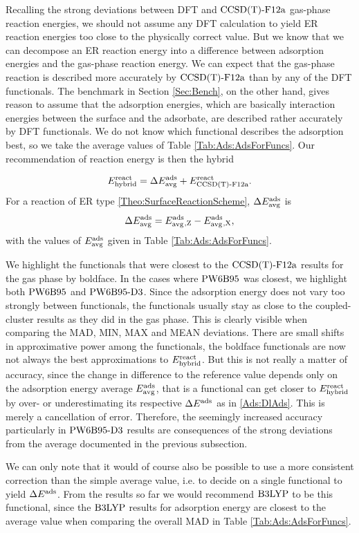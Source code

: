 Recalling the strong deviations between DFT and $\text{CCSD(T)-F12a}$ gas-phase
reaction energies, we should not assume any DFT calculation to yield
ER reaction energies too close to the physically correct value. But we know
that we can decompose an ER reaction energy into a difference between
adsorption energies and the gas-phase reaction energy. We can expect that
the gas-phase reaction is described more accurately by $\text{CCSD(T)-F12a}$ than by
any of the DFT functionals. The benchmark in Section \ref{Sec:Bench}, on
the other hand, gives reason to assume that the adsorption energies, which
are basically interaction energies between the surface and the adsorbate,
are described rather accurately by DFT functionals. We do not know which
functional describes the adsorption best, so we take the average values
of Table \ref{Tab:Ads:AdsForFuncs}. Our recommendation of reaction
energy is then the hybrid

\begin{equation}
 E^{\text{react}}_{\text{hybrid}}=\Delta E_{\text {avg}}^{\text{ads}} + E^{\text{react}}_{\text{CCSD(T)-F12a}}.
 \label{Ads:Erehyb}
\end{equation}
For a reaction of ER type \eqref{Theo:SurfaceReactionScheme}, $\Delta E_{\text {avg}}^{\text{ads}}$
is
\begin{equation}
 \Delta E_{\text {avg}}^{\text{ads}} = E_{\text {avg}}^{\text{ads}}{_{,\text Z}} - E_{\text {avg}}^{\text{ads}}{_{,\text X}},
 \label{Ads:DlAds}
\end{equation}
with the values of $E_{\text {avg}}^{\text{ads}}$ given in Table \ref{Tab:Ads:AdsForFuncs}. 

We highlight the functionals that were closest to the $\text{CCSD(T)-F12a}$
results for the gas phase by boldface. In the cases where $\text{PW6B95}$ was closest,
we highlight both $\text{PW6B95}$ and $\text{PW6B95}\text{-D3}$. Since the adsorption energy does not vary too 
strongly between functionals, the functionals usually stay 
as close to the coupled-cluster results as they did in the gas phase. This
is clearly visible when comparing the MAD, MIN, MAX and MEAN deviations.
There are small shifts in approximative power among the functionals,
the boldface functionals are now not always the best approximations to
$E^{\text{react}}_{\text{hybrid}}$.
But this is not really a matter of accuracy, since the change in difference
to the reference value depends only on the adsorption energy average $E_{\text {avg}}^{\text{ads}}$,
that is a functional can get closer to $E^{\text{react}}_{\text{hybrid}}$ by over- or underestimating
its respective $\Delta E^{\text{ads}}$ as in \eqref{Ads:DlAds}. This is merely a cancellation
of error. Therefore, the seemingly increased accuracy particularly in
$\text{PW6B95}\text{-D3}$ results are consequences of the strong deviations from the average
documented in the previous subsection.

We can only note that it would
of course also be possible to use a more consistent correction than the simple
average value, i.e. to decide on a single functional to yield $\Delta E^{\text{ads}}$.
From the results so far we would recommend $\text{B3LYP}$ to be this functional, 
since the $\text{B3LYP}$ results for adsorption energy are closest to the average
value when comparing the overall MAD in Table \ref{Tab:Ads:AdsForFuncs}. 

